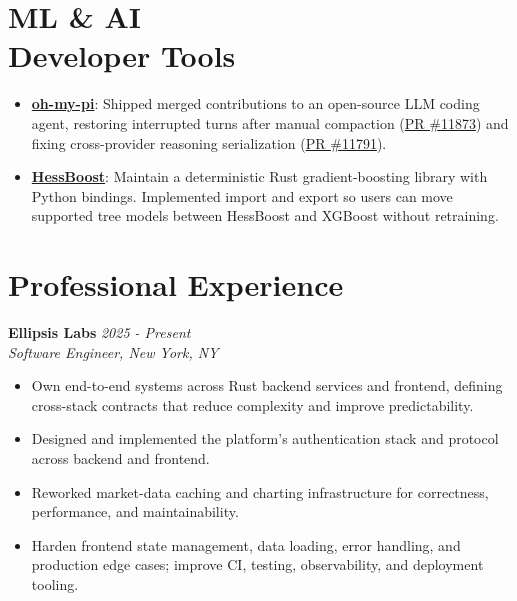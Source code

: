 \documentclass[margin,line]{resume}
\newcommand{\company}[1]{\textbf{#1}}
\newcommand{\jobdates}[1]{\textit{#1}}
\newcommand{\jobtitle}[1]{\textit{#1}}
\begin{document}
\begin{resume}
\vspace{4pt}

\section{ML \& AI\\Developer Tools}

\begin{itemize}[partopsep=0mm]
    \item \href{https://github.com/can1357/oh-my-pi}{\textbf{oh-my-pi}}: Shipped merged contributions to an open-source LLM coding agent, restoring interrupted turns after manual compaction (\href{https://github.com/can1357/oh-my-pi/pull/11873}{PR \#11873}) and fixing cross-provider reasoning serialization (\href{https://github.com/can1357/oh-my-pi/pull/11791}{PR \#11791}).
    \item \href{https://github.com/brndnmtthws/hessboost}{\textbf{HessBoost}}: Maintain a deterministic Rust gradient-boosting library with Python bindings. Implemented import and export so users can move supported tree models between HessBoost and XGBoost without retraining.
\end{itemize}

\vspace{4pt}

\section{Professional Experience}

\filbreak
\company{Ellipsis Labs} \hfill \jobdates{2025 - Present}\\
\jobtitle{Software Engineer, New York, NY}

\begin{itemize}
    \item Own end-to-end systems across Rust backend services and frontend, defining cross-stack contracts that reduce complexity and improve predictability.
    \item Designed and implemented the platform's authentication stack and protocol across backend and frontend.
    \item Reworked market-data caching and charting infrastructure for correctness, performance, and maintainability.
    \item Harden frontend state management, data loading, error handling, and production edge cases; improve CI, testing, observability, and deployment tooling.
\end{itemize}


\end{resume}
\end{document}

